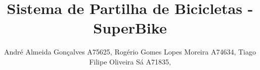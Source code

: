 \title{Sistema de Partilha de Bicicletas - SuperBike}

\author{
André Almeida Gonçalves A75625,
Rogério Gomes Lopes Moreira A74634,
Tiago Filipe Oliveira Sá A71835,}

\maketitle